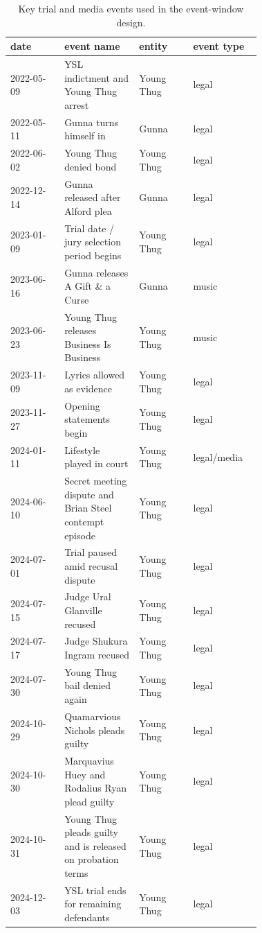 \documentclass[12pt]{article}
\begin{document}
\begin{table}[H]
\centering
\caption{Key trial and media events used in the event-window design.}
\label{tab:events}
\small
\begin{tabular}{p{0.18\linewidth}p{0.18\linewidth}p{0.18\linewidth}p{0.18\linewidth}}
\toprule
date & event name & entity & event type \\
\midrule
2022-05-09 & YSL indictment and Young Thug arrest & Young Thug & legal \\
2022-05-11 & Gunna turns himself in & Gunna & legal \\
2022-06-02 & Young Thug denied bond & Young Thug & legal \\
2022-12-14 & Gunna released after Alford plea & Gunna & legal \\
2023-01-09 & Trial date / jury selection period begins & Young Thug & legal \\
2023-06-16 & Gunna releases A Gift \& a Curse & Gunna & music \\
2023-06-23 & Young Thug releases Business Is Business & Young Thug & music \\
2023-11-09 & Lyrics allowed as evidence & Young Thug & legal \\
2023-11-27 & Opening statements begin & Young Thug & legal \\
2024-01-11 & Lifestyle played in court & Young Thug & legal/media \\
2024-06-10 & Secret meeting dispute and Brian Steel contempt episode & Young Thug & legal \\
2024-07-01 & Trial paused amid recusal dispute & Young Thug & legal \\
2024-07-15 & Judge Ural Glanville recused & Young Thug & legal \\
2024-07-17 & Judge Shukura Ingram recused & Young Thug & legal \\
2024-07-30 & Young Thug bail denied again & Young Thug & legal \\
2024-10-29 & Quamarvious Nichols pleads guilty & Young Thug & legal \\
2024-10-30 & Marquavius Huey and Rodalius Ryan plead guilty & Young Thug & legal \\
2024-10-31 & Young Thug pleads guilty and is released on probation terms & Young Thug & legal \\
2024-12-03 & YSL trial ends for remaining defendants & Young Thug & legal \\
\bottomrule
\end{tabular}
\end{table}
\end{document}
